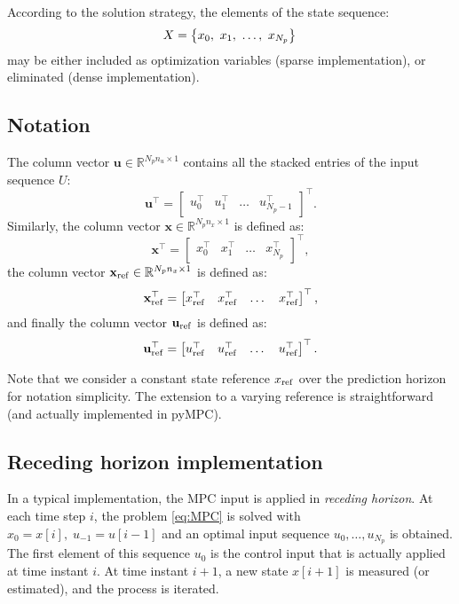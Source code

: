 \documentclass[a4paper,12pt,fleqn]{article}
\newcommand{\nin}{n_u}
\newcommand{\nx}{n_x}
\newcommand{\varx}{{X}}
\newcommand{\varxvec}{\mathbf{x}}
\newcommand{\varuvec}{\mathbf{u}}
\newcommand{\Np}{{N_p}}
\begin{document}
According to the solution strategy, the elements of the state sequence:
\begin{equation}
  \varx  = \left\{ x_0,\ x_1,\ \dots, \ x_{\Np} \right \}\\ 
\end{equation}
may be either included as optimization variables (sparse implementation), or eliminated (dense implementation).

\subsection{Notation}
The column vector $\varuvec \in \mathbb{R}^{\Np \nin \times 1}$ contains all the stacked entries of the input sequence $U$:
\begin{equation}
 \varuvec^\top = \begin{bmatrix} u_0^\top &u_1^\top &\dots& u_{\Np-1}^\top\end{bmatrix}^\top. 
\end{equation}
Similarly, the column vector $\varxvec \in \mathbb{R}^{\Np \nx \times 1}$ is defined as:
\begin{equation}
 \varxvec^\top = \begin{bmatrix} x_0^\top &x_1^\top &\dots& x_{\Np}^\top\end{bmatrix}^\top,
\end{equation}
the column vector $\varxvec_{\rm ref} \in \mathbb{R}^{\Np \nx \times 1}$ is defined as:
\begin{equation}
 {\varxvec}_{\rm ref}^\top = \begin{bmatrix} x_{\rm ref}^\top &x_{\rm ref}^\top &\dots& x_{\rm ref}^\top\end{bmatrix}^\top,
\end{equation}
and finally the column vector $\varuvec_{\rm ref}$ is defined as:
\begin{equation}
 {\varuvec}_{\rm ref}^\top = \begin{bmatrix} u_{\rm ref}^\top &u_{\rm ref}^\top &\dots& u_{\rm ref}^\top\end{bmatrix}^\top.
\end{equation}

Note that we consider a constant state reference $x_{\rm ref}$ over the prediction horizon for notation simplicity. The extension to a varying reference
is straightforward (and actually implemented in pyMPC).
 
\subsection{Receding horizon implementation}
In a typical implementation, the MPC input is applied in \emph{receding horizon}. At each time step $i$, the problem \eqref{eq:MPC} is solved with $x_0=x[i],\;u_{-1}=u[{i-1}]$ and an optimal input sequence $u_{0},\dots,u_{\Np}$ is obtained. The first element of this sequence $u_0$ is the control input that is actually applied at time instant $i$. At time instant $i+1$, a new state $x[i+1]$ is measured (or estimated), and the process is iterated. 
\end{document}
